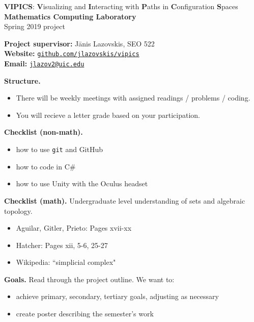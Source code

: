 \documentclass[10pt]{article}
\begin{document}
\def\vspacing{\vspace{.5cm}}

\noindent

\begin{center}
\large \textbf{VIPICS}: \textbf{V}isualizing and \textbf{I}nteracting with \textbf{P}aths in \textbf{C}onfiguration \textbf{S}paces
\\[5pt]\normalsize \textbf{Mathematics Computing Laboratory} \\
Spring 2019 project
\end{center}

\vspacing
 
\noindent
\textbf{Project supervisor:} J\=anis Lazovskis, SEO 522 \\
\textbf{Website:} \href{https://github.com/jlazovskis/vipics}{\texttt{github.com/jlazovskis/vipics}} \\
\textbf{Email:}  \href{mailto:jlazov2@uic.edu}{\nolinkurl{jlazov2@uic.edu}}

\vspacing

\noindent
\textbf{Structure.}
\begin{itemize}
\item There will be weekly meetings with assigned readings / problems / coding.
\item You will recieve a letter grade based on your participation.
\end{itemize}

\vspacing

\noindent
\textbf{Checklist (non-math).} 
\begin{itemize}
\item how to use \texttt{git} and GitHub
\item how to code in C\#
\item how to use Unity with the Oculus headset
\end{itemize}

\vspacing

\noindent
\textbf{Checklist (math).} Undergraduate level understanding of sets and algebraic topology.
\begin{itemize}
\item Aguilar, Gitler, Prieto: Pages xvii-xx
\item Hatcher: Pages xii, 5-6, 25-27
\item Wikipedia: ``simplicial complex"
\end{itemize}
\vspacing

\noindent
\textbf{Goals.} Read through the project outline. We want to:
\begin{itemize}
\item achieve primary, secondary, tertiary goals, adjusting as necessary
\item create poster describing the semester's work
\end{itemize}
\end{document}
